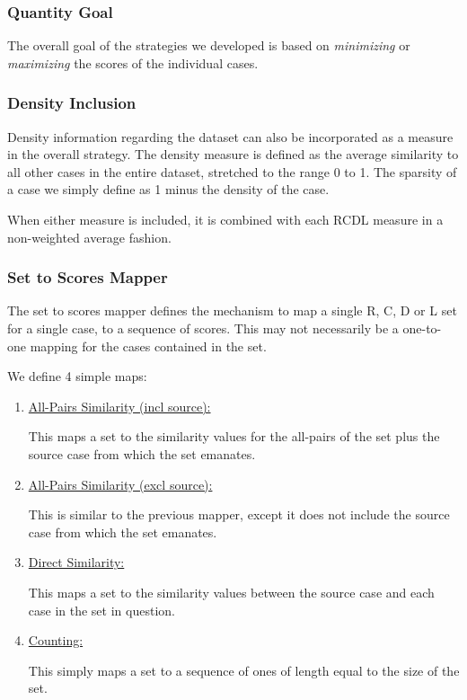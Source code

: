 \documentclass[a4paper,11pt]{report}
\begin{document}
\subsubsection{Quantity Goal}
The overall goal of the strategies we developed is based on \emph{minimizing} or \emph{maximizing} the scores of the individual cases.

\subsubsection{Density Inclusion}
Density information regarding the dataset can also be incorporated as a measure in the overall strategy. The density measure is defined as the average similarity to all other cases in the entire dataset, stretched to the range 0 to 1. The sparsity of a case we simply define as 1 minus the density of the case.

When either measure is included, it is combined with each RCDL measure in a non-weighted average fashion.

\subsubsection{Set to Scores Mapper}
The set to scores mapper defines the mechanism to map a single R, C, D or L set for a single case, to a sequence of scores. This may not necessarily be a one-to-one mapping for the cases contained in the set.

We define 4 simple maps:

\begin{enumerate}
\item \underline{All-Pairs Similarity (incl source):} 

This maps a set to the similarity values for the all-pairs of the set plus the source case from which the set emanates.
\item \underline{All-Pairs Similarity (excl source):} 

This is similar to the previous mapper, except it does not include the source case from which the set emanates.

\item \underline{Direct Similarity:} 

This maps a set to the similarity values between the source case and each case in the set in question.

\item \underline{Counting:} 

This simply maps a set to a sequence of ones of length equal to the size of the set.
\end{enumerate}
\end{document}
